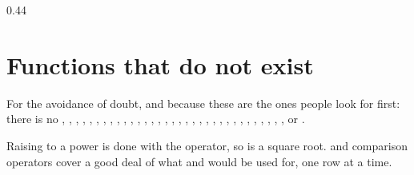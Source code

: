 \begin{ccexamples}{0.44\linewidth}
\end{ccexamples}

\section{Functions that do not exist}

For the avoidance of doubt, and because these are the ones people look for
first: there is no , , , ,
, , , , , ,
, , , , , ,
, , , , , ,
, , , , , ,
, , , , ,
 or .

Raising to a power is done with the \lit{\^{}} operator, so  is
a square root.  and comparison operators cover a good deal of what
 and  would be used for, one row at a time.

